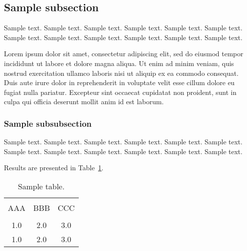 \documentclass[letterpaper, 12pt, jou, apacite]{apa6}
\begin{document}
    \subsection{Sample subsection}
    Sample text. Sample text. Sample text. Sample text. Sample text. Sample text. 
    Sample text. Sample text. Sample text. Sample text. Sample text. Sample text. 

    Lorem ipsum dolor sit amet, consectetur adipiscing elit, sed do eiusmod tempor incididunt ut labore et dolore magna aliqua. Ut enim ad minim veniam, quis nostrud exercitation ullamco laboris nisi ut aliquip ex ea commodo consequat. Duis aute irure dolor in reprehenderit in voluptate velit esse cillum dolore eu fugiat nulla pariatur. Excepteur sint occaecat cupidatat non proident, sunt in culpa qui officia deserunt mollit anim id est laborum.

    \subsubsection{Sample subsubsection}
    Sample text. Sample text. Sample text. Sample text. Sample text. Sample text. 
    Sample text. Sample text. Sample text. Sample text. Sample text. Sample text. 


    Results are presented in Table~\ref{tab1}.
    \begin{table}[!htb]
        \caption{Sample table.}\label{tab1}
        \begin{tabular}{ccc}
            \hline\\[-1.5ex]
            AAA & BBB & CCC \\[0.5ex]
            \hline\\[-1.5ex]
            1.0 & 2.0 & 3.0\\[0.5ex]
            1.0 & 2.0 & 3.0\\[0.5ex]
            \hline
        \end{tabular}
    \end{table}

    \newpage
    
\end{document}
